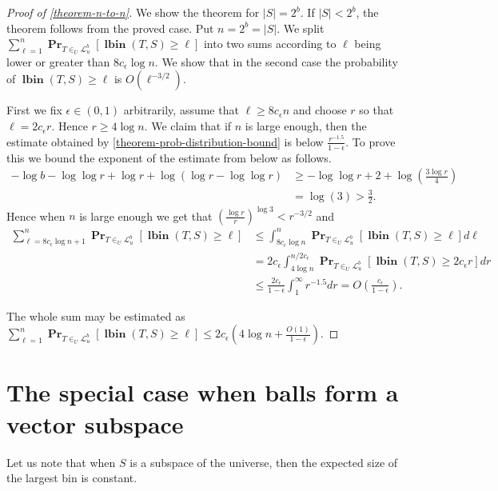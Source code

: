 \documentclass[unicode,review]{siamart1116}
\newcommand{\lbin}[2]{\operatorname{\mathbf{lbin}}({#1}, {#2})}
\newcommand{\linearmaps}[2]{\mathcal{L}_{#1}^{#2}}
\newcommand{\probs}[2]{\operatorname{\mathbf{Pr}}_{{#1}}\left[{#2}\right]}
\numberwithin{theorem}{section}
\begin{document}
\begin{proof}[Proof of \cref{theorem-n-to-n}]
We show the theorem for $|S| = 2^b$.
If $|S| < 2^b$, the theorem follows from the proved case.
Put $n = 2^b = |S|$.
We split $\sum_{\ell = 1}^{n} \probs{T\in_U\linearmaps{u}{b}}{\lbin{T}{S} \geq \ell}$ into two sums according to $\ell$ being lower or greater than $8c_\epsilon \log n$.
We show that in the second case the probability of $\lbin{T}{S} \geq \ell$ is $O(\ell^{-3/2})$.

First we fix $\epsilon \in (0, 1)$ arbitrarily, assume that $\ell \geq 8c_\epsilon n$ and choose $r$ so that $\ell = 2 c_\epsilon r$.
Hence $r \geq 4\log n$.
We claim that if $n$ is large enough, then the estimate obtained by \cref{theorem-prob-distribution-bound} is below $\frac{r^{-1.5}}{1-\epsilon}$.
To prove this we bound the exponent of the estimate from below as follows.
\begin{align*}
-\log b - \log \log r + \log r + \log (\log r - \log \log r) 
	& \geq -\log \log r + 2 + \log \left(\frac{3\log r}{4}\right) \\
	& = \log(3) > \frac{3}{2}.
\end{align*}
Hence when $n$ is large enough we get that $\left(\frac{\log r}{r}\right)^{\log 3} < r^{-3/2}$ and
\begin{align*}
\sum_{\ell = 8c_\epsilon \log n + 1}^{n} \probs{T\in_U\linearmaps{u}{b}}{\lbin{T}{S} \geq \ell} 
	& \leq \int_{8c_\epsilon \log n}^{n} \probs{T\in_U\linearmaps{u}{b}}{\lbin{T}{S} \geq \ell} d\ell \\
	& = 2c_\epsilon \int_{4 \log n}^{n/2c_\epsilon} \probs{T\in_U\linearmaps{u}{b}}{\lbin{T}{S} \geq 2c_\epsilon r} dr \\
	& \leq \frac{2c_\epsilon}{1-\epsilon} \int_{1}^{\infty} r^{-1.5} dr = O\left(\frac{c_\epsilon}{1-\epsilon}\right).
\end{align*}

The whole sum may be estimated as $
\sum_{\ell = 1}^{n} \probs{T\in_U\linearmaps{u}{b}}{\lbin{T}{S} \geq \ell} \leq 2c_\epsilon \left(4 \log n + \frac{O(1)}{1-\epsilon}\right).$
\end{proof}

\section{The special case when balls form a vector subspace}

Let us note that when $S$ is a subspace of the universe, then the expected size of the largest bin is constant.
\end{document}
